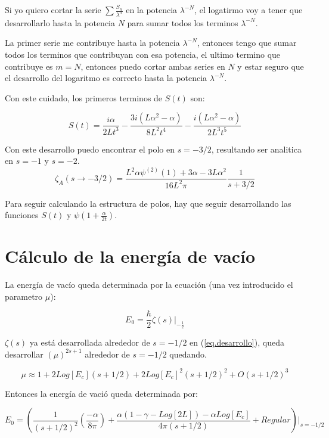 Si yo quiero cortar la serie $\sum \frac{S _n}{\lambda ^n}$ en la potencia $\lambda ^{-N}$, el logatirmo voy a tener que desarrollarlo hasta la potencia $N$ para sumar todos los terminos $\lambda ^{-N}$.

La primer serie me contribuye hasta la potencia $\lambda ^{-N}$, entonces tengo que sumar todos los terminos que contribuyan con esa potencia, el ultimo termino que contribuye es $m=N$, entonces puedo cortar ambas series en $N$ y estar seguro que el desarrollo del logaritmo es correcto hasta la potencia $\lambda ^{-N}$.

Con este cuidado, los primeros terminos de $S(t)$ son:

\begin{equation}
S(t) = 
\frac{i \alpha}{2 L t^3} -
\frac{3 i (L \alpha ^2 - \alpha)}{8 L^2 t ^4} -
\frac{i ( L \alpha ^2 - \alpha )}{2 L^3 t^5}
\end{equation}

Con este desarrollo puedo encontrar el polo en $s=-3/2$, resultando ser analitica en $s=-1$ y $s=-2$.
\begin{equation}
\zeta _A (s \rightarrow -3/2) = 
\frac{L ^2 \alpha \psi ^{(2)} (1) + 3 \alpha - 3 L \alpha ^2}{16 L^2 \pi}
\frac{1}{s+3/2}
\end{equation}

Para seguir calculando la estructura de polos, hay que seguir desarrollando las funciones $S(t)$ y $\psi (1 + \frac{\alpha}{2 t})$.

\section{Cálculo de la energía de vacío}

La energía de vacío queda determinada por la ecuación (una vez introducido el parametro $\mu$): 

\begin{equation}
    E _0 = \frac{\hbar}{2}  
    \zeta (s)  |  _{- \frac{1}{2}}
\end{equation}

$\zeta (s)$ ya está desarrollada alrededor de $s=-1/2$ en (\ref{eq.desarrollo}), queda desarrollar $(\mu) ^{2s+1} $ alrededor de $s=-1/2$ quedando.

\begin{equation}
    \mu \approx 
    1 + 2 Log[E_c] (s + 1/2) +
    2 Log[E_c] ^2 (s+1/2) ^2 + 
    O (s+1/2)^3
\end{equation}

Entonces la energía de vació queda determinada por:

\begin{equation}
    E _0 =
    \left(
    \frac{1}{(s+1/2)^2} 
    \left(
    \frac{- \alpha}{8 \pi}
    \right)+
    \frac{
    \alpha(1 -\gamma-Log[2L]) - 
    \alpha Log[E_c] 
    }{4 \pi (s+1/2)} 
     + Regular
    \right) | _{s=-1/2}
\end{equation}\\



 
